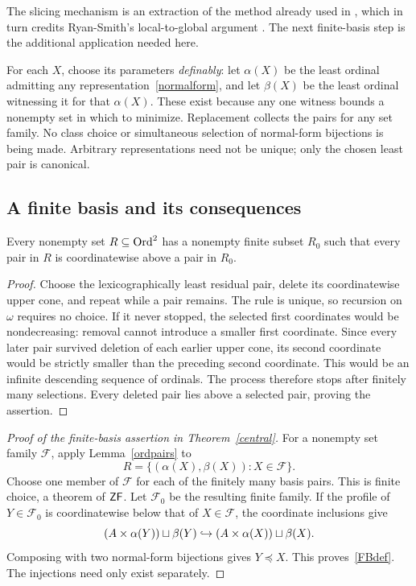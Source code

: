 The slicing mechanism is an extraction of the method already used in \cite[Lemma 7.1]{OpenAI}, which in turn credits Ryan-Smith's local-to-global argument \cite{RyanSmith}. The next finite-basis step is the additional application needed here.

For each $X$, choose its parameters \emph{definably}: let $\alpha(X)$ be the least ordinal admitting any representation~\eqref{normalform}, and let $\beta(X)$ be the least ordinal witnessing it for that $\alpha(X)$. These exist because any one witness bounds a nonempty set in which to minimize. Replacement collects the pairs for any set family. No class choice or simultaneous selection of normal-form bijections is being made. Arbitrary representations need not be unique; only the chosen least pair is canonical.

\subsection{A finite basis and its consequences}\label{finitebasis}

\begin{lemma}\label{ordpairs}
Every nonempty set $R\subseteq\operatorname{Ord}^2$ has a nonempty finite subset $R_0$ such that every pair in $R$ is coordinatewise above a pair in $R_0$.
\end{lemma}
\begin{proof}
Choose the lexicographically least residual pair, delete its coordinatewise upper cone, and repeat while a pair remains. The rule is unique, so recursion on $\omega$ requires no choice. If it never stopped, the selected first coordinates would be nondecreasing: removal cannot introduce a smaller first coordinate. Since every later pair survived deletion of each earlier upper cone, its second coordinate would be strictly smaller than the preceding second coordinate. This would be an infinite descending sequence of ordinals. The process therefore stops after finitely many selections. Every deleted pair lies above a selected pair, proving the assertion.
\end{proof}

\begin{proof}[Proof of the finite-basis assertion in Theorem~\ref{central}]
For a nonempty set family $\mathcal F$, apply Lemma~\ref{ordpairs} to
\[
 R=\{(\alpha(X),\beta(X)):X\in\mathcal F\}.
\]
Choose one member of $\mathcal F$ for each of the finitely many basis pairs. This is finite choice, a theorem of $\mathsf{ZF}$. Let $\mathcal F_0$ be the resulting finite family. If the profile of $Y\in\mathcal F_0$ is coordinatewise below that of $X\in\mathcal F$, the coordinate inclusions give
\[
 (A\times\alpha(Y))\sqcup\beta(Y)
 \hookrightarrow (A\times\alpha(X))\sqcup\beta(X).
\]
Composing with two normal-form bijections gives $Y\preccurlyeq X$. This proves~\eqref{FBdef}. The injections need only exist separately.
\end{proof}

